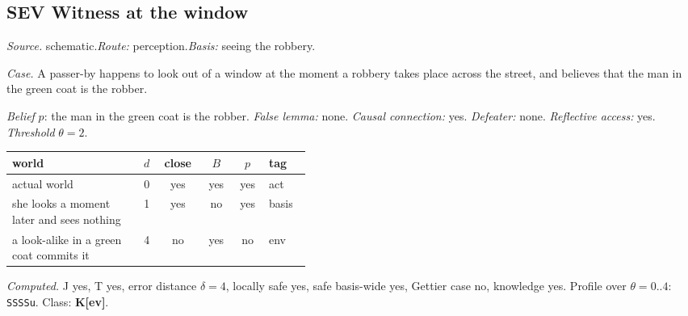 \subsection*{SEV \enspace Witness at the window}
\noindent\textit{Source.} schematic.\quad \textit{Route:} perception.\quad \textit{Basis:} seeing the robbery.\par
\noindent\textit{Case.} A passer-by happens to look out of a window at the moment a robbery takes place across the street, and believes that the man in the green coat is the robber.\par
\noindent\textit{Belief} $p$: the man in the green coat is the robber.
 \textit{False lemma:} none. \textit{Causal connection:} yes. \textit{Defeater:} none. \textit{Reflective access:} yes. \textit{Threshold} $\theta = 2$.\par
\begin{center}\begin{tabular}{@{}p{0.43\linewidth}rcccl@{}}
world & $d$ & close & $B$ & $p$ & tag \\ \midrule
actual world & 0 & yes & yes & yes & act \\
she looks a moment later and sees nothing & 1 & yes & no & yes & basis \\
a look-alike in a green coat commits it & 4 & no & yes & no & env \\
\end{tabular}\end{center}
\noindent\textit{Computed.} J yes, T yes, error distance $\delta = 4$, locally safe yes, safe basis-wide yes, Gettier case no, knowledge yes. Profile over $\theta = 0..4$: \texttt{SSSSu}. Class: \textbf{K[ev]}.
\par\medskip
{}
